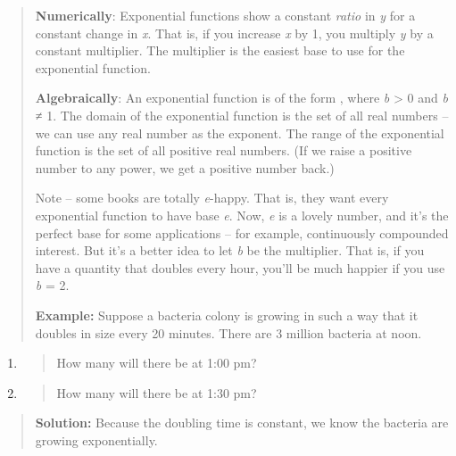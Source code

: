 \begin{quote}
\textbf{Numerically}: Exponential functions show a constant \emph{ratio}
in \emph{y} for a constant change in \emph{x}. That is, if you increase
\emph{x} by 1, you multiply \emph{y} by a constant multiplier. The
multiplier is the easiest base to use for the exponential function.

\textbf{Algebraically}: An exponential function is of the form , where
\emph{b} \textgreater{} 0 and \emph{b} ≠ 1. The domain of the
exponential function is the set of all real numbers -- we can use any
real number as the exponent. The range of the exponential function is
the set of all positive real numbers. (If we raise a positive number to
any power, we get a positive number back.)

Note -- some books are totally \emph{e}-happy. That is, they want every
exponential function to have base \emph{e}. Now, \emph{e} is a lovely
number, and it's the perfect base for some applications -- for example,
continuously compounded interest. But it's a better idea to let \emph{b}
be the multiplier. That is, if you have a quantity that doubles every
hour, you'll be much happier if you use \emph{b} = 2.

\textbf{Example:} Suppose a bacteria colony is growing in such a way
that it doubles in size every 20 minutes. There are 3 million bacteria
at noon.
\end{quote}

\begin{enumerate}
\def\labelenumi{\alph{enumi}.}
\item
  \begin{quote}
  How many will there be at 1:00 pm?
  \end{quote}
\item
  \begin{quote}
  How many will there be at 1:30 pm?
  \end{quote}
\end{enumerate}

\begin{quote}
\textbf{Solution:} Because the doubling time is constant, we know the
bacteria are growing exponentially.
\end{quote}

